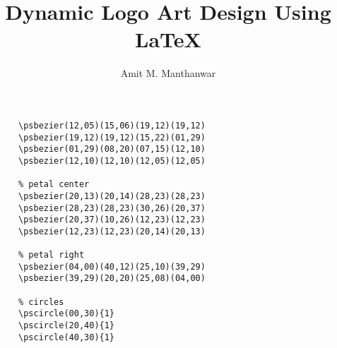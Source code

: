 \documentclass{pst-icon}
\title{Dynamic Logo Art Design Using \LaTeX}
\author{Amit M. Manthanwar}
\begin{document}
\maketitle
\begin{figure}[!h]
\centering%
%
\end{figure}%
\listingsTeX
\begin{figure}[!h]
\centering%
\begin{lstlisting}[basicstyle=\normalsize, title=\large{Construction},aboveskip=15mm,belowskip=10mm,abovecaptionskip=0mm,belowcaptionskip=4mm]
% petal left
\psbezier(12,05)(15,06)(19,12)(19,12)
\psbezier(19,12)(19,12)(15,22)(01,29)
\psbezier(01,29)(08,20)(07,15)(12,10)
\psbezier(12,10)(12,10)(12,05)(12,05)

% petal center
\psbezier(20,13)(20,14)(28,23)(28,23)
\psbezier(28,23)(28,23)(30,26)(20,37)
\psbezier(20,37)(10,26)(12,23)(12,23)
\psbezier(12,23)(12,23)(20,14)(20,13)

% petal right
\psbezier(04,00)(40,12)(25,10)(39,29)
\psbezier(39,29)(20,20)(25,08)(04,00)

% circles
\pscircle(00,30){1}
\pscircle(20,40){1}
\pscircle(40,30){1}
\end{lstlisting}
\end{figure}
\end{document}

